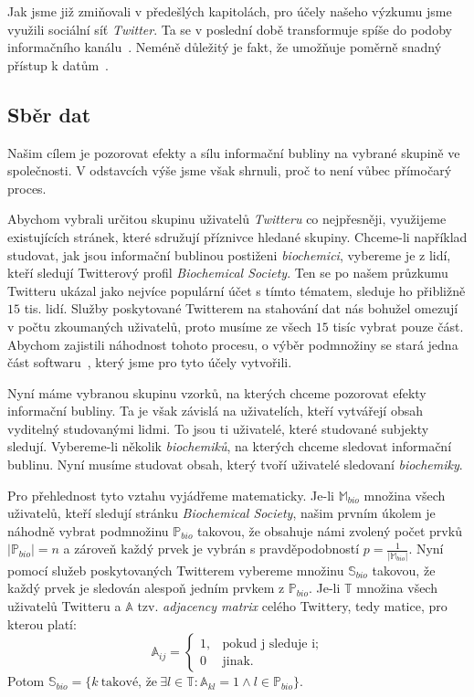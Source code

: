 \documentclass[12pt, a4paper]{article}
\numberwithin{equation}{section} 	%
\begin{document}
Jak jsme již zmiňovali v předešlých kapitolách, pro účely našeho výzkumu jsme využili sociální síť \textit{Twitter}. Ta se v poslední době transformuje spíše do podoby informačního kanálu~\cite{whyNotFb}. Neméně důležitý je fakt, že umožňuje poměrně snadný přístup k datům~\cite{tweepy, twitterAPI}.

\subsection{Sběr dat}
\noindent Našim cílem je pozorovat efekty a sílu informační bubliny na vybrané skupině ve společnosti. V odstavcích výše jsme však shrnuli, proč to není vůbec přímočarý proces.

Abychom vybrali určitou skupinu uživatelů \textit{Twitteru} co nejpřesněji, využijeme existujících stránek, které sdružují příznivce hledané skupiny. Chceme-li například studovat, jak jsou informační bublinou postiženi \textit{biochemici}, vybereme je z lidí, kteří sledují Twitterový profil \textit{Biochemical Society}. Ten se po našem průzkumu Twitteru ukázal jako nejvíce populární účet s tímto tématem, sleduje ho přibližně $15$ tis. lidí. Služby poskytované Twitterem na stahování dat nás bohužel omezují v počtu zkoumaných uživatelů, proto musíme ze všech $15$ tisíc vybrat pouze část. Abychom zajistili náhodnost tohoto procesu, o výběr podmnožiny se stará jedna část softwaru~\cite{myRepo}, který jsme pro tyto účely vytvořili.

Nyní máme vybranou skupinu vzorků, na kterých chceme pozorovat efekty informační bubliny. Ta je však závislá na uživatelích, kteří vytvářejí obsah vyditelný studovanými lidmi. To jsou ti uživatelé, které studované subjekty sledují. Vybereme-li několik \textit{biochemiků}, na kterých chceme sledovat informační bublinu. Nyní musíme studovat obsah, který tvoří uživatelé sledovaní \textit{biochemiky}.

Pro přehlednost tyto vztahu vyjádřeme matematicky. Je-li $\mathbb{M}_{bio}$ množina všech uživatelů, kteří sledují stránku \textit{Biochemical Society}, našim prvním úkolem je náhodně vybrat podmnožinu $\mathbb{P}_{bio}$ takovou, že obsahuje námi zvolený počet prvků $\left\vert{\mathbb{P}_{bio}}\right\vert = n$ a zároveň každý prvek je vybrán s pravděpodobností $p = \frac{1}{\left\vert{\mathbb{M}_{bio}}\right\vert}$. Nyní pomocí služeb poskytovaných Twitterem vybereme množinu $\mathbb{S}_{bio}$ takovou, že každý prvek je sledován alespoň jedním prvkem z $\mathbb{P}_{bio}$. Je-li $\mathbb{T}$ množina všech uživatelů Twitteru a  $\mathbb{A}$ tzv. \textit{adjacency matrix} celého Twittery, tedy matice, pro kterou platí:
\begin{equation}
    \mathbb{A}_{ij}=
    \begin{cases}
        1, &\text{pokud j sleduje i;}\\
        0 &\text{jinak.}
    \end{cases}
\end{equation}
Potom $\mathbb{S}_{bio} = \{k\ \text{takové, že}\ \exists l\in\mathbb{T}: \mathbb{A}_{kl} = 1 \wedge l\in\mathbb{P}_{bio} \}$.
\end{document}
